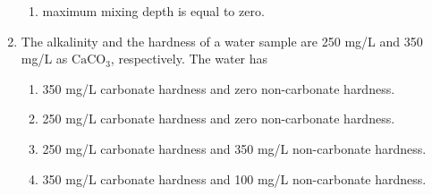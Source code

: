 \documentclass[journal]{IEEEtran}
\begin{document}
\begin{enumerate}
\begin{enumerate}
			\item maximum mixing depth is equal to zero.
		\end{enumerate}
	\item 
	The alkalinity and the hardness of a water sample are 250 mg/L and 350 mg/L as $\text{CaCO}_3$, respectively. The water has 
		\begin{enumerate}
			\item 350 mg/L carbonate hardness and zero non-carbonate hardness.
			\item 250 mg/L carbonate hardness and zero non-carbonate hardness.
			\item 250 mg/L carbonate hardness and 350 mg/L non-carbonate hardness.
			\item 350 mg/L carbonate hardness and 100 mg/L non-carbonate hardness.
		\end{enumerate}
	
	







\end{enumerate}
\end{document}
